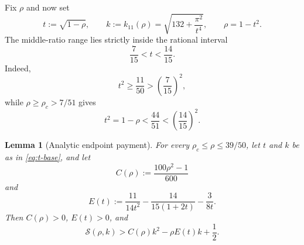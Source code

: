 \documentclass[11pt]{article}
\newtheorem{lemma}[theorem]{Lemma}
\theoremstyle{remark}
\begin{document}
Fix \(\rho\) and now set
\begin{equation}
 t:=\sqrt{1-\rho},
 \qquad
 k:=k_{11}(\rho)
 =\sqrt{132+\frac{\pi^2}{t^4}},
 \qquad
 \rho=1-t^2.
 \label{eq:t-base}
\end{equation}
The middle-ratio range lies strictly inside the rational interval
\begin{equation}
 \frac7{15}<t<\frac{14}{15}.
 \label{eq:t-interval}
\end{equation}
Indeed,
\[
 t^2\geq\frac{11}{50}>\left(\frac7{15}\right)^2,
 \]
while \(\rho\geq\rho_c>7/51\) gives
\[
 t^2=1-\rho<\frac{44}{51}
 <\left(\frac{14}{15}\right)^2.
 \]

\begin{lemma}[Analytic endpoint payment]
\label{lem:endpoint-payment}
For every \(\rho_c\leq\rho\leq39/50\), let \(t\) and \(k\) be as in
\eqref{eq:t-base}, and let
\begin{equation}
 C(\rho):=\frac{100\rho^2-1}{600}
 \label{eq:C}
\end{equation}
and
\begin{equation}
 E(t):=
 \frac{11}{14t^2}
 -\frac{14}{15(1+2t)}
 -\frac{3}{8t}.
 \label{eq:E}
\end{equation}
Then \(C(\rho)>0\), \(E(t)>0\), and
\begin{equation}
 \mathcal S(\rho,k)>
 C(\rho)k^2-\rho E(t)k+\frac12.
 \label{eq:S-base-lower}
\end{equation}
\end{lemma}
\end{document}
